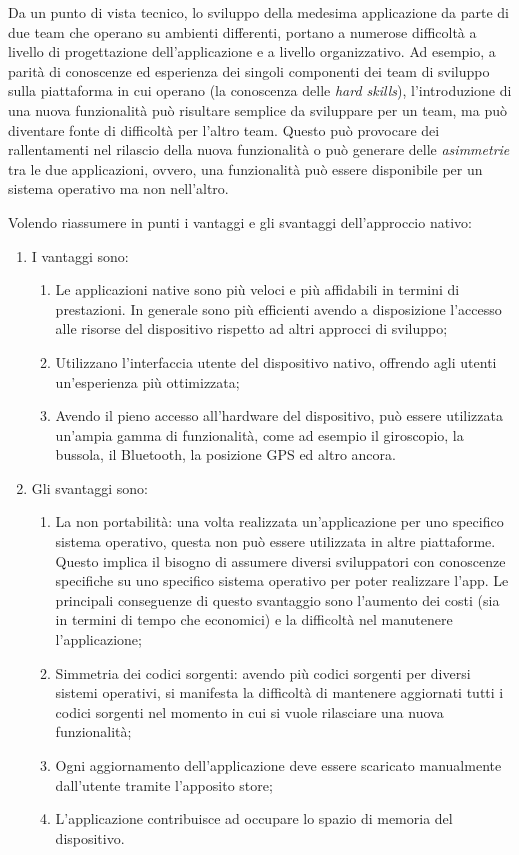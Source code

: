Da un punto di vista tecnico, lo sviluppo della medesima applicazione da parte di due team che operano su ambienti differenti, portano a numerose difficoltà a livello di progettazione dell'applicazione e a livello organizzativo. Ad esempio, a parità di conoscenze ed esperienza dei singoli componenti dei team di sviluppo sulla piattaforma in cui operano (la conoscenza delle \textit{hard skills}), l'introduzione di una nuova funzionalità può risultare semplice da sviluppare per un team, ma può diventare fonte di difficoltà per l'altro team. Questo può provocare dei rallentamenti nel rilascio della nuova funzionalità o può generare delle \textit{asimmetrie} tra le due applicazioni, ovvero, una funzionalità può essere disponibile per un sistema operativo ma non nell'altro.

Volendo riassumere in punti i vantaggi e gli svantaggi dell'approccio nativo:
\begin{enumerate}
	\item I vantaggi sono:
	\begin{enumerate}
		\item Le applicazioni native sono più veloci e più affidabili in termini di prestazioni. In generale sono più efficienti avendo a disposizione l'accesso alle risorse del dispositivo rispetto ad altri approcci di sviluppo;
		\item Utilizzano l'interfaccia utente del dispositivo nativo, offrendo agli utenti un'esperienza più ottimizzata;
		\item Avendo il pieno accesso all'hardware del dispositivo, può essere utilizzata un'ampia gamma di funzionalità, come ad esempio il giroscopio, la bussola, il Bluetooth, la posizione GPS ed altro ancora.
	\end{enumerate}

	\item Gli svantaggi sono:
	\begin{enumerate}
		\item La non portabilità: una volta realizzata un'applicazione per uno specifico sistema operativo, questa non può essere utilizzata in altre piattaforme. Questo implica il bisogno di assumere diversi sviluppatori con conoscenze specifiche su uno specifico sistema operativo per poter realizzare l'app. Le principali conseguenze di questo svantaggio sono l'aumento dei costi (sia in termini di tempo che economici) e la difficoltà nel manutenere l'applicazione;
		\item Simmetria dei codici sorgenti: avendo più codici sorgenti per diversi sistemi operativi, si manifesta la difficoltà di mantenere aggiornati tutti i codici sorgenti nel momento in cui si vuole rilasciare una nuova funzionalità;
		\item Ogni aggiornamento dell'applicazione deve essere scaricato manualmente dall'utente tramite l'apposito store;
		\item L'applicazione contribuisce ad occupare lo spazio di memoria del dispositivo.
	\end{enumerate}

\end{enumerate}

